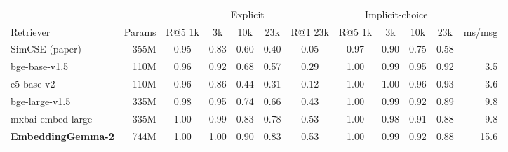 \begin{tabular}{lr|ccccc|cccc|r}
\toprule
 & & \multicolumn{5}{c|}{Explicit} & \multicolumn{4}{c|}{Implicit-choice} &  \\
Retriever & Params & R@5 1k & 3k & 10k & 23k & R@1 23k & R@5 1k & 3k & 10k & 23k & ms/msg \\
\midrule
SimCSE (paper) & 355M & 0.95 & 0.83 & 0.60 & 0.40 & 0.05 & 0.97 & 0.90 & 0.75 & 0.58 & -- \\
\midrule
bge-base-v1.5 & 110M & 0.96 & 0.92 & 0.68 & 0.57 & 0.29 & 1.00 & 0.99 & 0.95 & 0.92 & 3.5 \\
e5-base-v2 & 110M & 0.96 & 0.86 & 0.44 & 0.31 & 0.12 & 1.00 & 1.00 & 0.96 & 0.93 & 3.6 \\
bge-large-v1.5 & 335M & 0.98 & 0.95 & 0.74 & 0.66 & 0.43 & 1.00 & 0.99 & 0.92 & 0.89 & 9.8 \\
mxbai-embed-large & 335M & 1.00 & 0.99 & 0.83 & 0.78 & 0.53 & 1.00 & 0.98 & 0.91 & 0.88 & 9.8 \\
\textbf{EmbeddingGemma-2} & 744M & 1.00 & 1.00 & 0.90 & 0.83 & 0.53 & 1.00 & 0.99 & 0.92 & 0.88 & 15.6 \\
\bottomrule
\end{tabular}
